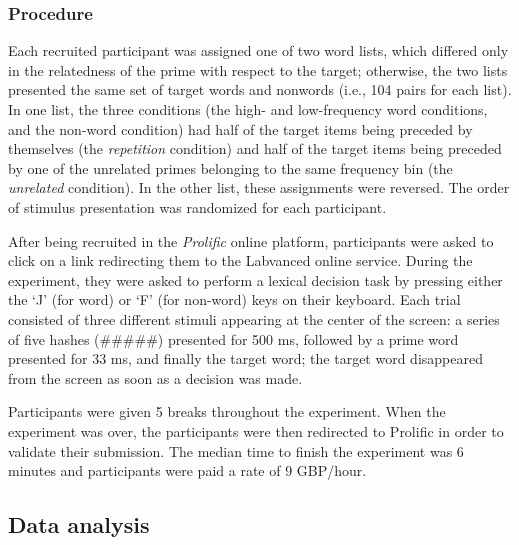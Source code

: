 \documentclass[
]{interact}
\begin{document}
\subsubsection{Procedure}\label{sec-exp1-methods-proc}

Each recruited participant was assigned one of two word lists, which
differed only in the relatedness of the prime with respect to the
target; otherwise, the two lists presented the same set of target words
and nonwords (i.e., 104 pairs for each list). In one list, the three
conditions (the high- and low-frequency word conditions, and the
non-word condition) had half of the target items being preceded by
themselves (the \emph{repetition} condition) and half of the target
items being preceded by one of the unrelated primes belonging to the
same frequency bin (the \emph{unrelated} condition). In the other list,
these assignments were reversed. The order of stimulus presentation was
randomized for each participant.

After being recruited in the \emph{Prolific} online platform,
participants were asked to click on a link redirecting them to the
Labvanced online service. During the experiment, they were asked to
perform a lexical decision task by pressing either the `J' (for word) or
`F' (for non-word) keys on their keyboard. Each trial consisted of three
different stimuli appearing at the center of the screen: a series of
five hashes (\#\#\#\#\#) presented for 500 ms, followed by a prime word
presented for 33 ms, and finally the target word; the target word
disappeared from the screen as soon as a decision was made.

Participants were given 5 breaks throughout the experiment. When the
experiment was over, the participants were then redirected to Prolific
in order to validate their submission. The median time to finish the
experiment was 6 minutes and participants were paid a rate of 9
GBP/hour.

\subsection{Data analysis}\label{sec-exp1-analysis}
\end{document}
